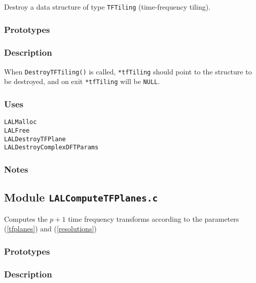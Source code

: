 Destroy a data structure of type \verb+TFTiling+ (time-frequency tiling).

\subsubsection*{Prototypes}
\vspace{0.1in}


\subsubsection*{Description}

When \verb+DestroyTFTiling()+ is called, \verb+*tfTiling+ should point to the
structure to be destroyed, and on exit \verb+*tfTiling+ will be \verb+NULL+.

\subsubsection*{Uses}
\begin{verbatim}
LALMalloc
LALFree
LALDestroyTFPlane
LALDestroyComplexDFTParams
\end{verbatim}
\subsubsection*{Notes}

\vfill{\footnotesize}

\newpage
\subsection{Module \texttt{LALComputeTFPlanes.c}}
\label{ss:LALComputeTFPlanes.c}

Computes the $p+1$ time frequency transforms according to the parameters
(\ref{tfplanes}) and (\ref{resolutions})

\subsubsection*{Prototypes}
\vspace{0.1in}


\subsubsection*{Description}

